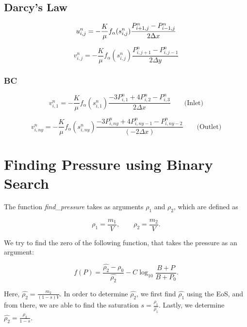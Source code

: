 \documentclass[a4paper,12pt]{article}
\begin{document}
\subsection{Darcy's Law}

\[
    u_{i,j}^n = -\frac{K}{\mu} f_\alpha (s_{i, j}^n)
    \frac{P_{i + 1, j}^n - P_{i - 1, j}^n}{2\Delta x} \\
\] 

\[
    v_{i,j}^n = -\frac{K}{\mu} f_\alpha(s_{i, j}^n)
    \frac{P_{i, j + 1}^n - P_{i, j - 1}^n}{2\Delta y}
\] 

\subsubsection{BC}

\[
    v_{i, 1}^n = -\frac{K}{\mu} f_\alpha(s_{i, 1}^n)
    \frac{-3 P_{i, 1}^n + 4 P_{i, 2}^n - P_{i, 3}^n }
    {2 \Delta x} \qquad \text{(Inlet)}
\] 

\[
    v_{i, ny}^n = -\frac{K}{\mu} f_\alpha(s_{i, ny}^n)
    \frac{-3 P_{i, ny}^n + 4 P_{i, ny - 1}^n
    - P_{i, ny - 2}^n }{(-2 \Delta x)}
    \qquad \text{(Outlet)}
\] 

\section{Finding Pressure using Binary Search}

The function \emph{find\_pressure} takes as arguments
\(\rho_1\) and \(\rho_2\), which are defined as

\[
\rho_1 = \frac{m_1}{V}, \qquad
\rho_2 = \frac{m_2}{V}
.\] 

We try to find the zero of the following function, that
takes the pressure as an argument:

\begin{equation*}
    f(P) = \frac{\hat{\rho_2} - \rho_0}{\hat{\rho_2}}
    - C \log_{10} \frac{B + P}{B + P_0}
.\end{equation*}

Here, \(\hat{\rho_2} = \frac{m_2}{(1 - s)V}\).
In order to determine \(\hat{\rho_2}\), we first find
\(\hat{\rho_1}\) using the EoS, and from there, we are
able to find the saturation
\(s = \frac{\rho_1}{\hat{\rho_1}}\).
Lastly, we determine \(\hat{\rho_2} = \frac{\rho_2}{1 - s}\).

% 
% 
% 
\end{document}
